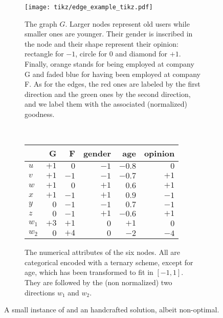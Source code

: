 \begin{figure*}[htpb]
  \begin{subfigure}[t]{0.55\textwidth}
    \centering
    \texttt{[image: tikz/edge\_example\_tikz.pdf]}
    \caption{The graph $G$. Larger nodes represent old users while smaller ones are younger. Their
    gender is inscribed in the node and their shape represent their opinion: rectangle for $-1$,
    circle for $0$ and diamond for $+1$. Finally, orange stands for being employed at company G and
    faded blue for having been employed at company F. As for the edges, the red ones are labeled by
    the first direction and the green ones by the second direction, and we label them with the
    associated (normalized) goodness. } \label{fig:edge_exe_graph}
  \end{subfigure}~
  \begin{subfigure}[t]{0.42\textwidth}
    \centering
    \small
    \begin{tabular}{lrrrrr}
      \toprule
      {} & \textsf{G} & \textsf{F} & \textsf{gender} & \textsf{age} & \textsf{opinion} \\
      \midrule
      $u$   &  $+1$ &   $0$ &   $-1$ &  $-0.8$ &     $0$ \\
      $v$   &  $+1$ &  $-1$ &   $-1$ &  $-0.7$ &    $+1$ \\
      $w$   &  $+1$ &   $0$ &   $+1$ &   $0.6$ &    $+1$ \\
      $x$   &  $+1$ &  $-1$ &   $+1$ &   $0.9$ &    $-1$ \\
      $y$   &   $0$ &  $-1$ &   $-1$ &   $0.7$ &    $-1$ \\
      $z$   &   $0$ &  $-1$ &   $+1$ &  $-0.6$ &    $+1$ \\
      \midrule
      $w_1$ &  $+3$ &  $+1$ &    $0$ &    $+1$ &     $0$ \\
      $w_2$ &  $0$  &  $+4$ &    $0$ &    $-2$ &    $-4$ \\
      \bottomrule
    \end{tabular}
    \caption{The numerical attributes of the six nodes. All are categorical encoded with a ternary
      scheme, except for \textsf{age}, which has been transformed to fit in $[-1, 1]$.
      They are followed by the (non normalized) two directions $w_1$ and $w_2$.}
      \label{tab:edge_exe}
  \end{subfigure}
  \caption{A small instance of \ecp{} and an handcrafted solution, albeit non-optimal.}
  \label{fig:edge_exe}
\end{figure*}

